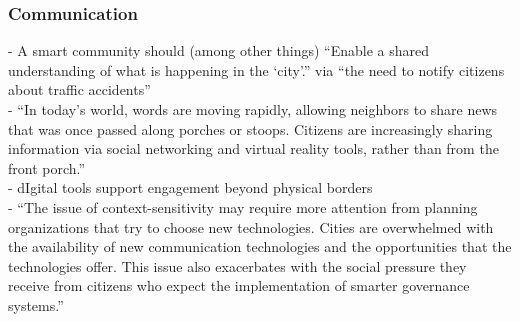 \subsubsection{Communication}

-{\color{orange} A smart community should (among other things) “Enable a shared understanding of what is happening in the ‘city’.” via “the need to notify citizens about traffic accidents”\cite{Rivera2020}}\\
-{\color{orange} “In today’s world, words are moving rapidly, allowing neighbors to share news that was once passed along porches or stoops. Citizens are increasingly sharing information via social networking and virtual reality tools, rather than from the front porch.”} \cite{Evans-Cowley2010}\\
-{\color{orange} dIgital tools support engagement beyond physical borders} \cite{Evans-Cowley2010}\\
-{\color{orange} “The issue of context-sensitivity may require more attention from planning organizations that try to choose new technologies. Cities are overwhelmed with the availability of new communication technologies and the opportunities that the technologies offer. This issue also exacerbates with the social pressure they receive from citizens who expect the implementation of smarter governance systems.”}\cite{Afzalan2017}\\

